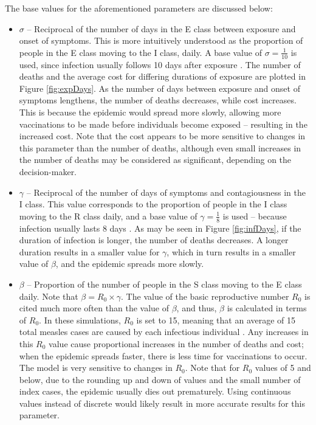 The base values for the aforementioned parameters are discussed below:
\begin{itemize}
    \item $\sigma$ -- Reciprocal of the number of days in the E class between exposure and onset of symptoms. This is more intuitively understood as the proportion of people in the E class moving to the I class, daily. A base value of $\sigma = \frac{1}{10}$ is used, since infection usually follows 10 days after exposure \cite{who_2019}. The number of deaths and the average cost for differing durations of exposure are plotted in Figure \ref{fig:expDays}. As the number of days between exposure and onset of symptoms lengthens, the number of deaths decreases, while cost increases. This is because the epidemic would spread more slowly, allowing more vaccinations to be made before individuals become exposed -- resulting in the increased cost. Note that the cost appears to be more sensitive to changes in this parameter than the number of deaths, although even small increases in the number of deaths may be considered as significant, depending on the decision-maker.
    \item $\gamma$ -- Reciprocal of the number of days of symptoms and contagiousness in the I class. This value corresponds to the proportion of people in the I class moving to the R class daily, and a base value of $\gamma = \frac{1}{8}$ is used -- because infection usually lasts 8 days \cite{who_2019}. As may be seen in Figure \ref{fig:infDays}, if the duration of infection is longer, the number of deaths decreases. A longer duration results in a smaller value for $\gamma$, which in turn results in a smaller value of $\beta$, and the epidemic spreads more slowly.
    \item $\beta$ -- Proportion of the number of people in the S class moving to the E class daily. Note that $\beta = R_{0} \times \gamma$. The value of the basic reproductive number $R_{0}$ is cited much more often than the value of $\beta$, and thus, $\beta$ is calculated in terms of $R_{0}.$ In these simulations, $R_{0}$ is set to 15, meaning that an average of 15 total measles cases are caused by each infectious individual \cite{guerra2017basic}. Any increases in this $R_{0}$ value cause proportional increases in the number of deaths and cost; when the epidemic spreads faster, there is less time for vaccinations to occur. The model is very sensitive to changes in $R_{0}$. Note that for $R_{0}$ values of 5 and below, due to the rounding up and down of values and the small number of index cases, the epidemic usually dies out prematurely. Using continuous values instead of discrete would likely result in more accurate results for this parameter.

\end{itemize}
